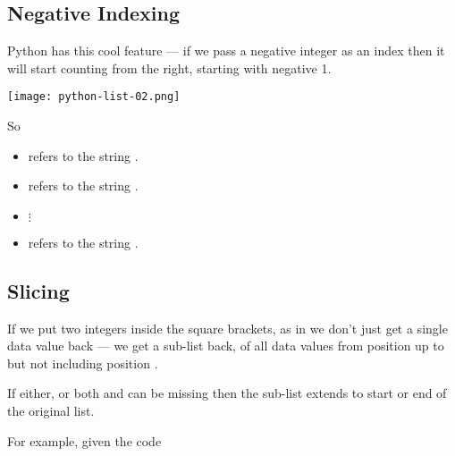 \documentclass{coderdojo}
\begin{document}
\newpage
\subsection*{Negative Indexing} 

Python has this cool feature --- if we pass a negative integer as an index then it will start counting from the right, starting with negative 1.

\vspace{6pt}
\centerline{\texttt{[image: python-list-02.png]}}

So 
\begin{itemize}
\item {} refers to the string .
\item {} refers to the string .
\item[] \hspace{3cm}$\vdots$
\item {} refers to the string .
\end{itemize}

\subsection*{Slicing}

If we put two integers inside the square brackets, as in \code{[m:n]} we don't just get a single data value back --- we get a sub-list back, of all data values from position  up to but not including position . 

If either, or both  and  can be missing then the sub-list extends to start or end of the original list.

For example, given the code

\vspace{6pt}
\centerline{}
\end{document}
